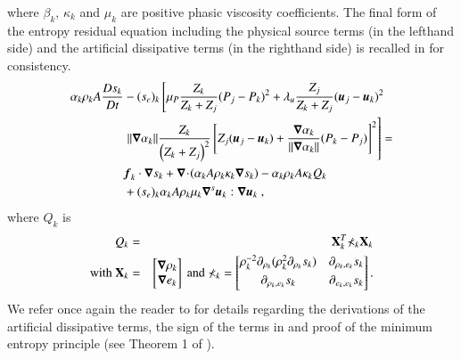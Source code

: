 \documentclass[preprint,10pt]{elsarticle}
\begin{document}
%
where $\beta_k$, $\kappa_k$ and $\mu_k$ are positive phasic viscosity coefficients. The final form of the entropy residual equation including the physical source terms (in the lefthand side) and the artificial dissipative terms (in the righthand side) is recalled in  for consistency.
%
\begin{align} \label{eq:full-ent-equ-7-eq-model}
\alpha_k \rho_k A \frac{Ds_k}{Dt} &- (s_{e})_k \left[\mu_P \frac{Z_k}{Z_k+Z_j} (P_j - P_k)^2 + \lambda_u \frac{Z_j}{Z_k+Z_j} (\boldsymbol u_j -\boldsymbol u_k)^2 \right. \nonumber
\\
&\left. \| \boldsymbol\nabla \alpha_k \| \frac{Z_k}{\left( Z_k+Z_j \right)^2} \left[ Z_j (\boldsymbol u_j-\boldsymbol u_k)+\frac{\boldsymbol\nabla \alpha_k}{\| \boldsymbol\nabla \alpha_k \|}(P_k-P_j)\right]^2 \right] = \nonumber \\
&\boldsymbol f_k \cdot \boldsymbol\nabla s_k + \boldsymbol\nabla\! \cdot \! \left( \alpha_k A \rho_k \kappa_k  \boldsymbol\nabla s_k \right) 
- \alpha_k \rho_k A \kappa_k Q_k \nonumber \\
&+ (s_e)_k \alpha_k A \rho_k \mu_k \boldsymbol\nabla^s \boldsymbol u_k : \boldsymbol\nabla \boldsymbol u_k \ ,
\end{align}
%
where $Q_k$ is 
%
\begin{eqnarray}
Q_k &=& \mathbf{X}^T_k \mathbb{\Sigma}_k \mathbf{X}_k \nonumber \\
\text{with } \mathbf{X}_k &=& \begin{bmatrix}
\boldsymbol\nabla \rho_k \\
\boldsymbol\nabla e_k 
\end{bmatrix}
\text{ and } \mathbb{\Sigma}_k = \begin{bmatrix}
       \rho_k^{-2} \partial_{\rho_k} (\rho^2_k \partial_{\rho_k} s_k) & \partial_{\rho_k,e_k} s_k  \\[0.3em]
       \partial_{\rho_k,e_k} s_k & \partial_{e_k,e_k} s_k           \\[0.3em]
     \end{bmatrix}. \nonumber 
\end{eqnarray}
%
We refer once again the reader to \cite{Marco_paper_sem} for details regarding the derivations of the artificial dissipative terms, the sign of the terms in  and proof of the minimum entropy
principle (see Theorem 1 of \cite{Marco_paper_sem}).
\end{document}
